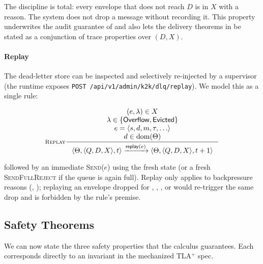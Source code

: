 The discipline is total: every envelope that does not reach \(D\)
is in \(X\) with a reason.  The system does not drop a message
without recording it.  This property underwrites the audit
guarantee of  and also lets the delivery
theorems in  be stated as a conjunction of
trace properties over \((D, X)\).

\paragraph{Replay}
The dead-letter store can be inspected and selectively re-injected by
a supervisor (the runtime exposes
\texttt{POST /api/v1/admin/k2k/dlq/replay}).  We model this as a
single rule:

\begin{equation}
\inference[\textsc{Replay}]
{
  (e, \lambda) \in X \\
  \lambda \in \{\state{Overflow}, \state{Evicted}\} \\
  e = \langle s, d, m, \tau, \ldots\rangle \\
  d \in \dom(\Theta)
}
{
  \langle \Theta, \langle Q, D, X\rangle, t\rangle
  \trans{\mathsf{replay}(e)}
  \langle \Theta, \langle Q, D, X\rangle, t+1\rangle
}
\label{rule:k2k-replay}
\end{equation}

\noindent followed by an immediate \textsc{Send}(\(e\)) using the
fresh state (or a fresh \textsc{SendFullReject} if the queue is
again full).  Replay only applies to backpressure reasons
(, ); replaying an envelope
dropped for , ,
, or  would re-trigger
the same drop and is forbidden by the rule's premise.

\subsection{Safety Theorems}
\label{sec:k2k:theorems}

We can now state the three safety properties that the calculus
guarantees.  Each corresponds directly to an invariant in the
mechanized TLA\ensuremath{^{+}} spec.

